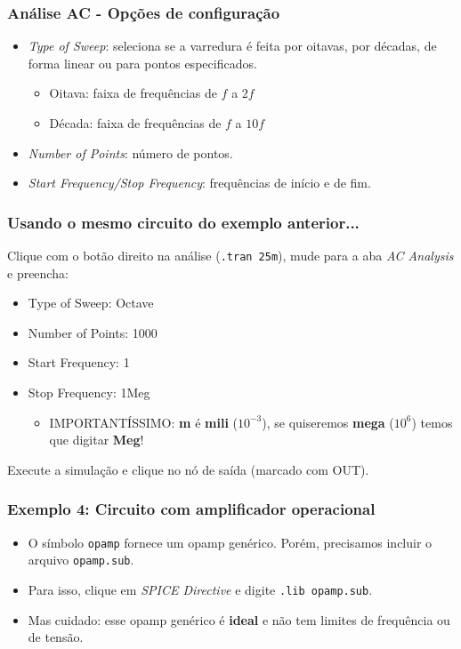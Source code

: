\documentclass{beamer}
\begin{document}
\begin{frame}
\frametitle{Análise AC - Opções de configuração}
\begin{itemize}
\item{\textit{Type of Sweep}}: seleciona se a varredura é feita por oitavas, por décadas, de forma linear ou para pontos especificados.
\begin{itemize}
\item{Oitava}: faixa de frequências de $f$ a $2 f$
\item{Década}: faixa de frequências de $f$ a $10 f$
\end{itemize}
\item{\textit{Number of Points}}: número de pontos.
\item{\textit{Start Frequency/Stop Frequency}}: frequências de início e de fim.
\end{itemize}
\end{frame}

\begin{frame}
\frametitle{Usando o mesmo circuito do exemplo anterior...}
Clique com o botão direito na análise (\texttt{.tran 25m}), mude para a aba \textit{AC Analysis} e preencha:
\begin{itemize}

\item{Type of Sweep}: Octave
\item{Number of Points}: 1000
\item{Start Frequency}: 1
\item{Stop Frequency}: 1Meg
\begin{itemize}
\item{IMPORTANTÍSSIMO}: \textbf{m} é \textbf{mili} ($10^{-3}$), se quiseremos \textbf{mega} ($10^6$) temos que digitar \textbf{Meg}!
\end{itemize}
\end{itemize}
Execute a simulação e clique no nó de saída (marcado com OUT).
\end{frame}

\begin{frame}
\frametitle{Exemplo 4: Circuito com amplificador operacional}
\begin{itemize}
\item{O símbolo \texttt{opamp} fornece um opamp genérico. Porém, precisamos incluir o arquivo \texttt{opamp.sub}.}
\item{Para isso, clique em \textit{SPICE Directive} e digite \texttt{.lib opamp.sub}}.
\item{Mas cuidado: esse opamp genérico é \textbf{ideal} e não tem limites de frequência ou de tensão.}
\end{itemize}
\end{frame}
\end{document}
